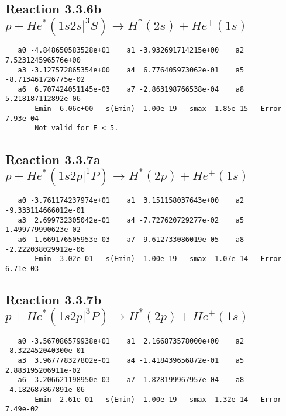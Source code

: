 \documentclass[12pt]{article}
\begin{document}
                               


\newpage
\subsection{
Reaction 3.3.6b $   p + He^*(1s2s|^3S) \rightarrow H^*(2s) + He^+(1s)$}


\begin{small}\begin{verbatim}
   a0 -4.848650583528e+01    a1 -3.932691714215e+00    a2  7.523124596576e+00
   a3 -3.127572865354e+00    a4  6.776405973062e-01    a5 -8.713461726775e-02
   a6  6.707424051145e-03    a7 -2.863198766538e-04    a8  5.218187112892e-06
       Emin  6.06e+00   s(Emin)  1.00e-19   smax  1.85e-15   Error  7.93e-04
       Not valid for E < 5.
\end{verbatim}\end{small}

\newpage
\subsection{
Reaction 3.3.7a $   p + He^*(1s2p|^1P) \rightarrow H^*(2p) + He^+(1s)$}


\begin{small}\begin{verbatim}
   a0 -3.761174237974e+01    a1  3.151158037643e+00    a2 -9.333114666012e-01
   a3  2.699732305042e-01    a4 -7.727620729277e-02    a5  1.499779990623e-02
   a6 -1.669176505953e-03    a7  9.612733086019e-05    a8 -2.222038029912e-06
       Emin  3.02e-01   s(Emin)  1.00e-19   smax  1.07e-14   Error  6.71e-03
\end{verbatim}\end{small}

\newpage
\subsection{
Reaction 3.3.7b $   p + He^*(1s2p|^3P) \rightarrow H^*(2p) + He^+(1s)$}


\begin{small}\begin{verbatim}
   a0 -3.567086579938e+01    a1  2.166873578000e+00    a2 -8.322452040300e-01
   a3  3.967778327802e-01    a4 -1.418439656872e-01    a5  2.883195206911e-02
   a6 -3.206621198950e-03    a7  1.828199967957e-04    a8 -4.182687867891e-06
       Emin  2.61e-01   s(Emin)  1.00e-19   smax  1.32e-14   Error  7.49e-02
\end{verbatim}\end{small}
\end{document}
